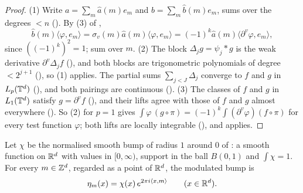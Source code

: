 \begin{proof}
\leanok
(1) Write $a = \sum_m \hat a(m) e_m$ and $b = \sum_m \hat b(m) e_m$, sums over the degrees
$< n$ (). By (3) of ,
\[
  \hat b(m) \langle \varphi, e_m \rangle = \sigma_v(m) \hat a(m) \langle \varphi, e_m \rangle
  = (-1)^k \hat a(m) \langle \partial^v \varphi, e_m \rangle ,
\]
since $((-1)^k)^2 = 1$; sum over $m$. (2) The block $\Delta_j g = \psi_j * g$ is the weak
derivative $\partial^v \Delta_j f$ (), and both blocks
are trigonometric polynomials of degree $< 2^{j+1}$ (), so (1)
applies. The partial sums $\sum_{j < J} \Delta_j$ converge to $f$ and $g$ in $L_p(\mathbb{T}^d)$
(), and both pairings are continuous
(). (3) The classes of $f$ and $g$ in $L_1(\mathbb{T}^d)$ satisfy
$g = \partial^v f$ (), and their lifts agree with
those of $f$ and $g$ almost everywhere (). So (2) for $p = 1$ gives
$\int \varphi \, (g \circ \pi) = (-1)^k \int (\partial^v \varphi) (f \circ \pi)$ for every test
function $\varphi$; both lifts are locally integrable (), and
 applies.
\end{proof}

\begin{definition}
\label{def:torus-modulated-bump}
\leanok
{}
Let $\chi$ be the normalised smooth bump of radius $1$ around $0$ of
: a smooth function on $\mathbb{R}^d$ with values in $[0, \infty)$,
support in the ball $B(0, 1)$ and $\int \chi = 1$. For every $m \in \mathbb{Z}^d$, regarded as a point
of $\mathbb{R}^d$, the modulated bump is
\[
  \eta_m(x) = \chi(x) \, e^{2\pi i \langle x, m \rangle} \qquad (x \in \mathbb{R}^d) .
\]
\end{definition}

